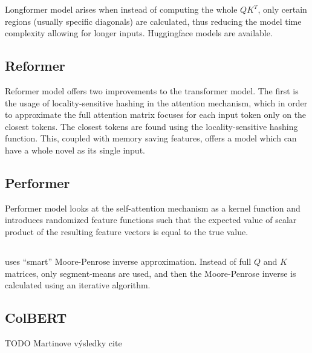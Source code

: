 Longformer model \citep{longformer} arises when instead of computing the whole $QK^T$, only certain regions (usually specific diagonals) are calculated, thus reducing the model time complexity allowing for longer inputs.
Huggingface models are available.

\subsection{Reformer}

Reformer model \citep{reformer} offers two improvements to the transformer model.
The first is the usage of locality-sensitive hashing in the attention mechanism, which in order to approximate the full attention matrix focuses for each input token only on the closest tokens.
The closest tokens are found using the locality-sensitive hashing function.
This, coupled with memory saving features, offers a model which can have a whole novel as its single input.

\subsection{Performer}

Performer model \citep{performer} looks at the self-attention mechanism as a kernel function and introduces randomized feature functions such that the expected value of scalar product %
of the resulting feature vectors is equal to the true value.

\subsection{\nystr{}}

\nystr{} \citep{nystrom} uses ``smart'' Moore-Penrose inverse approximation. Instead of full $Q$ and $K$ matrices, only segment-means are used, and then the Moore-Penrose inverse is calculated using an iterative algorithm.

\subsection{ColBERT}

\citep{colbert}
TODO Martinove výsledky cite



